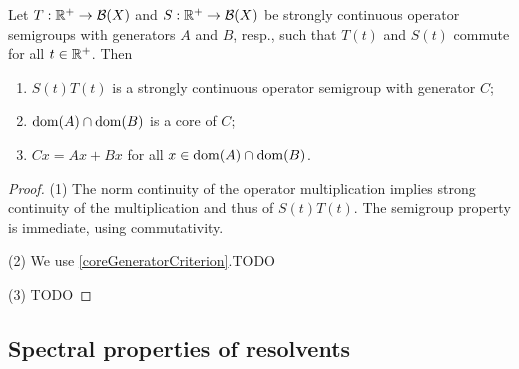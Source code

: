 \begin{proposition} \label{productSemigroup}
Let $T: \mathbb{R}^+\to \operatorname{\mathcal{B}}(X)$ and $S: \mathbb{R}^+\to \operatorname{\mathcal{B}}(X)$ be strongly continuous operator semigroups with generators $A$ and $B$, resp., such that $T(t)$ and $S(t)$ commute for all $t\in \mathbb{R}^+$. Then
\begin{enumerate}
\item $S(t)T(t)$ is a strongly continuous operator semigroup with generator $C$;
\item $\operatorname{dom}(A)\cap \operatorname{dom}(B)$ is a core of $C$;
\item $Cx = Ax + Bx$ for all $x\in \operatorname{dom}(A)\cap \operatorname{dom}(B)$.
\end{enumerate}
\end{proposition}
\begin{proof}
(1) The norm continuity of the operator multiplication implies strong continuity of the multiplication and thus of $S(t)T(t)$. The semigroup property is immediate, using commutativity.

(2) We use \ref{coreGeneratorCriterion}.TODO

(3) TODO
\end{proof}

\subsection{Spectral properties of resolvents}

